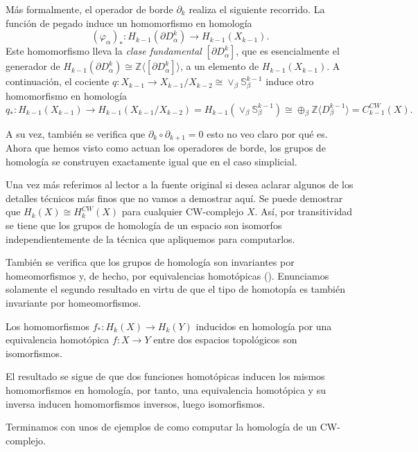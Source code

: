 Más formalmente, el operador de borde $\partial_k$ realiza el siguiente recorrido. La función de pegado induce un homomorfismo en homología 
\[
(\varphi_{\alpha})_* : H_{k-1}(\partial D_{\alpha}^k)\to H_{k-1}(X_{k-1}).
\]
Este homomorfismo lleva la \textit{clase fundamental} $[\partial D_{\alpha}^k]$, que es esencialmente el generador de $H_{k-1}(\partial D_{\alpha}^k)\cong \mathbb{Z}\langle [\partial D_{\alpha}^k]\rangle$, a un elemento de $H_{k-1}(X_{k-1})$. A continuación, el cociente $q: X_{k-1}\to X_{k-1}/X_{k-2} \cong \vee_{\beta}\mathbb{S}_{\beta}^{k-1}$ induce otro homomorfismo en homología 
\[
q_*: H_{k-1}(X_{k-1}) \to H_{k-1}(X_{k-1}/X_{k-2}) = H_{k-1}(\vee_{\beta}\mathbb{S}_{\beta}^{k-1}) \cong \oplus_{\beta}\mathbb{Z}\langle D^{k-1}_{\beta} \rangle = C^{CW}_{k-1}(X).
\]

A su vez, también se verifica que $\partial_{k}\circ\partial_{k+1} = 0$ {\color{red} esto no veo claro por qué es}. Ahora que hemos visto como actuan los operadores de borde, los grupos de homología se construyen exactamente igual que en el caso simplicial.

Una vez más referimos al lector a la fuente original \cite{munoz2021} si desea aclarar algunos de los detalles técnicos más finos que no vamos a demostrar aquí. Se puede demostrar que $H_k(X)\cong H^{CW}_k(X)$ para cualquier CW-complejo $X$. Así, por transitividad se tiene que los grupos de homología de un espacio son isomorfos independientemente de la técnica que apliquemos para computarlos.

También se verifica que los grupos de homología son invariantes por homeomorfismos y, de hecho, por equivalencias homotópicas (\cite[p.~111]{hatcher2002}). Enunciamos solamente el segundo resultado en virtu de que el tipo de homotopía es también invariante por homeomorfismos.

\begin{theorem}
    Los homomorfismos $f_*:H_k(X)\to H_k(Y)$ inducidos en homología por una equivalencia homotópica $f:X\to Y$ entre dos espacios topológicos son isomorfismos.
\end{theorem}

El resultado se sigue de que dos funciones homotópicas inducen los mismos homomorfismos en homología, por tanto, una equivalencia homotópica y su inversa inducen homomorfismos inversos, luego isomorfismos.

Terminamos con unos de ejemplos de como computar la homología de un CW-complejo.

